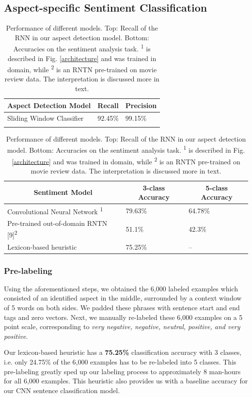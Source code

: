 \documentclass{article} %
\begin{document}
\subsection{Aspect-specific Sentiment Classification}

\begin{table}[t]
\begin{center}
\begin{tabular}{lll}
\multicolumn{1}{c}{\bf Aspect Detection Model}  &\multicolumn{1}{c}{\bf Recall}  &\multicolumn{1}{c}{\bf Precision} \\ \hline
Sliding Window Classifier & 92.45\%  & 99.15\%\\
&\\
\end{tabular}
\begin{tabular}{lll}
\multicolumn{1}{c}{\bf Sentiment Model}  &\multicolumn{1}{c}{\bf 3-class Accuracy} &\multicolumn{1}{c}{\bf 5-class Accuracy} \\ \hline
 Convolutional Neural Network \textsuperscript{1} & 79.63\% & 64.78\% \\
 Pre-trained out-of-domain RNTN [9]\textsuperscript{2}       & 51.1\% & 42.3\% \\
 Lexicon-based heuristic	& 75.25\% & -- \\
\end{tabular}
\end{center}
\caption{Performance of different models. Top: Recall of the RNN in our aspect detection model. Bottom: Accuracies on the sentiment analysis task. \textsuperscript{1} is described in Fig. \ref{architecture} and was trained in domain, while \textsuperscript{2} is an RNTN pre-trained on movie review data. The interpretation is discussed more in text.}
\label{ModelResultsTable}
\end{table}

\subsubsection{Pre-labeling}
Using the aforementioned steps, we obtained the 6,000 labeled examples which consisted of an identified aspect in the middle, surrounded by a context window of 5 words on both sides. We padded these phrases with sentence start and end tags and zero vectors. Next, we manually re-labeled these 6,000 examples on a 5 point scale, corresponding to \textit{very negative, negative, neutral, positive, and very positive}.

Our lexicon-based heuristic has a \textbf{75.25\%} classification accuracy with 3 classes, i.e. only 24.75\% of the 6,000 examples has to be re-labeled into 5 classes. This pre-labeling greatly sped up our labeling process to approximately 8 man-hours for all 6,000 examples. This heuristic also provides us with a baseline accuracy for our CNN sentence classification model.
\end{document}
